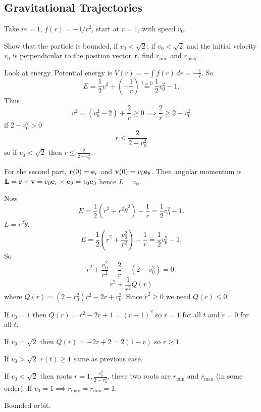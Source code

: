 \documentclass[10pt, a4paper]{article}
\begin{document}
\newpage

\section{}

\subsection{Gravitational Trajectories}

Take $m = 1$,
$f(r) = -1 / r ^ 2$,
start at $r = 1$,
with speed $v_0$.

\begin{problem}
    Show that the particle is bounded,
    if $v_0 < \sqrt{2}$;
    if $v_0 < \sqrt{2}$ and the initial velocity $v_0$ is perpendicular to the position vector $\mathbf{r}$,
    find $r_{\text{min}}$ and $r_{\text{max}}$.

    \begin{solution}
        Look at energy.
        Potential energy is $V(r) = -\int f(r)\,dr = -\frac{1}{r}$.
        So
        \[
        E = \frac{1}{2}v ^ 2 + \left(-\frac{1}{r}\right) \overset{t = 0}{=} \frac{1}{2}v_0 ^ 2 - 1.
        \]
        Thus
        \[
        v ^ 2 = (v_0 ^ 2 - 2) + \frac{2}{r} \geq 0 \implies \frac{2}{r} \geq 2 - v_0 ^ 2
        \]
        if $2 - v_0 ^ 2 > 0$
        \[
        r \leq \frac{2}{2 - v_0 ^ 2}
        \]
        so if $v_0 < \sqrt{2}$ then $r \leq \frac{2}{2 - v_0 ^ 2}$.


        For the second part,
        $\mathbf{r}(0) = \mathbf{e}_r$ and $\mathbf{v}(0) = v_0\mathbf{e}_{\theta}$.
        Then angular momentum is $\mathbf{L} = \mathbf{r} \times \mathbf{v} = v_0\mathbf{e}_r \times \mathbf{e}_{\theta} = v_0\mathbf{e}_3$ hence $L = v_0$.

        Now
        \[
        E = \frac{1}{2}(\dot{r} ^ 2 + r ^ 2\dot{\theta} ^ 2) - \frac{1}{r} = \frac{1}{2}v_0 ^ 2 - 1.
        \]
        $L = r ^ 2\dot{\theta}$.
        \[
        E = \frac{1}{2}\left(\dot{r} ^ 2 + \frac{v_0 ^ 2}{r ^ 2}\right) - \frac{1}{r} = \frac{1}{2}v_0 ^ 2 - 1.
        \]
        So
        \[
        \dot{r} ^ 2 + \frac{v_0 ^ 2}{r ^ 2} - \frac{2}{r} + (2 - v_0 ^ 2) = 0.
        \]
        \[
        \dot{r} ^ 2 + \frac{1}{r ^ 2}Q(r)
        \]
        where
        $Q(r) = (2 - r_0 ^ 2)r ^ 2 - 2r + r_0 ^ 2$.
        Since $\dot{r} ^ 2 \geq 0$ we need $Q(r) \leq 0$.

        If $v_0 = 1$ then $Q(r) = r ^ 2 - 2r + 1 = (r - 1) ^ 2$ so $r = 1$ for all $t$ and $\dot{r} = 0$ for all $t$.

        If $v_0 = \sqrt{2}$ then $Q(r) = -2r + 2 = 2(1 - r)$ so $r \geq 1$.

        If $v_0 > \sqrt{2}$ $r(t) \geq 1$ same as previous case.

        If $v_0 < \sqrt{2}$ then roots $r = 1, \frac{v_0 ^ 2}{2 - v_0 ^ 2}$,
        these two roots are $r_{\text{min}}$ and $r_{\text{max}}$
        (in some order).
        If $v_0 = 1 \implies r_{\text{max}} = r_{\text{min}} = 1$.

        Bounded orbit.
    \end{solution}
\end{problem}
\end{document}
